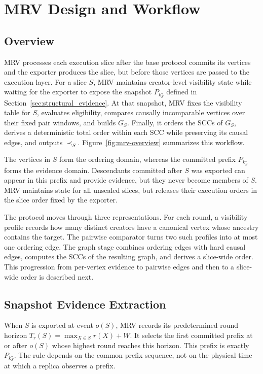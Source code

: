 \section{MRV Design and Workflow}
\label{sec:design}

\subsection{Overview}

MRV processes each execution slice after the base protocol commits its vertices and the exporter produces the slice, but before those vertices are passed to the execution layer. For a slice $S$, MRV maintains creator-level visibility state while waiting for the exporter to expose the snapshot $P_{k^\star_S}$ defined in Section~\ref{sec:structural_evidence}. At that
snapshot, MRV fixes the visibility table for $S$, evaluates eligibility, compares causally incomparable vertices over their fixed pair windows, and builds $G_S$. Finally, it orders the SCCs of $G_S$, derives a deterministic total order within each SCC while preserving its causal edges, and outputs $\prec_S$. Figure~\ref{fig:mrv-overview} summarizes this workflow.

The vertices in $S$ form the ordering domain, whereas the committed prefix $P_{k^\star_S}$ forms the evidence domain. Descendants committed after $S$ was exported can appear in this prefix and provide evidence, but they never become members of $S$. MRV maintains state for all unsealed slices, but releases their execution orders in the slice order fixed by the exporter.

The protocol moves through three representations. For each round, a visibility profile records how many distinct creators have a canonical vertex whose ancestry contains the target. The pairwise comparator turns two such profiles into at most one ordering edge. The graph stage combines ordering edges with hard causal edges, computes the SCCs of the resulting graph, and derives a slice-wide order. This progression from per-vertex evidence to pairwise edges and then to a slice-wide order is described next.


\subsection{Snapshot Evidence Extraction}
\label{sec:evidence_extraction}

When $S$ is exported at event $o(S)$, MRV records its predetermined round horizon $T_r(S)=\max_{X\in S}r(X)+W$. It selects the first committed prefix at or after $o(S)$ whose highest round reaches this horizon. This prefix is exactly $P_{k^\star_S}$. The rule depends on the common prefix sequence, not on the physical time at which a replica observes a prefix.

